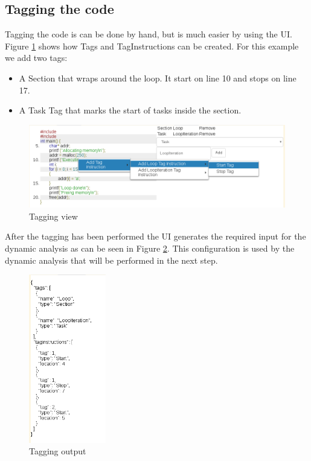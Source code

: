 \subsection{Tagging the code}

Tagging the code is can be done by hand, but is much easier by using the UI. Figure \ref{cap1:example:code-tag} shows how Tags and TagInstructions can be created. For this example we add two tags:

\begin{itemize}
	\item A Section that wraps around the loop. It start on line 10 and stops on line 17.
	\item A Task Tag that marks the start of tasks inside the section.
\end{itemize}

\begin{figure}[!ht]
	\centering
	\includegraphics[width=1\textwidth]{simple-tag}
	\caption{Tagging view}
	\label{cap1:example:code-tag}
\end{figure}

After the tagging has been performed the UI generates the required input for the dynamic analysis as can be seen in Figure \ref{cap1:example:code-source}. This configuration is used by the dynamic analysis that will be performed in the next step.

\begin{figure}[!ht]
	\centering
	\includegraphics[width=0.3\textwidth]{simple-source}
	\caption{Tagging output}
	\label{cap1:example:code-source}
\end{figure}

